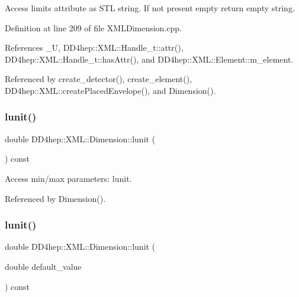 Access limits attribute as S\+TL string. If not present empty return empty string. 



Definition at line 209 of file X\+M\+L\+Dimension.\+cpp.



References \+\_\+U, D\+D4hep\+::\+X\+M\+L\+::\+Handle\+\_\+t\+::attr(), D\+D4hep\+::\+X\+M\+L\+::\+Handle\+\_\+t\+::has\+Attr(), and D\+D4hep\+::\+X\+M\+L\+::\+Element\+::m\+\_\+element.



Referenced by create\+\_\+detector(), create\+\_\+element(), D\+D4hep\+::\+X\+M\+L\+::create\+Placed\+Envelope(), and Dimension().

\hypertarget{struct_d_d4hep_1_1_x_m_l_1_1_dimension_a0d0bd5961871858cd652f4f2b8cae305}{}\label{struct_d_d4hep_1_1_x_m_l_1_1_dimension_a0d0bd5961871858cd652f4f2b8cae305} 
\subsubsection{\texorpdfstring{lunit()}{lunit()}\hspace{0.1cm}{\footnotesize\ttfamily [1/2]}}
{\footnotesize\ttfamily double D\+D4hep\+::\+X\+M\+L\+::\+Dimension\+::lunit (\begin{DoxyParamCaption}{ }\end{DoxyParamCaption}) const}



Access min/max parameters\+: lunit. 



Referenced by Dimension().

\hypertarget{struct_d_d4hep_1_1_x_m_l_1_1_dimension_ac2040c00dca00f75d40882c42a7884ee}{}\label{struct_d_d4hep_1_1_x_m_l_1_1_dimension_ac2040c00dca00f75d40882c42a7884ee} 
\subsubsection{\texorpdfstring{lunit()}{lunit()}\hspace{0.1cm}{\footnotesize\ttfamily [2/2]}}
{\footnotesize\ttfamily double D\+D4hep\+::\+X\+M\+L\+::\+Dimension\+::lunit (\begin{DoxyParamCaption}\item[{double}]{default\+\_\+value }\end{DoxyParamCaption}) const}



